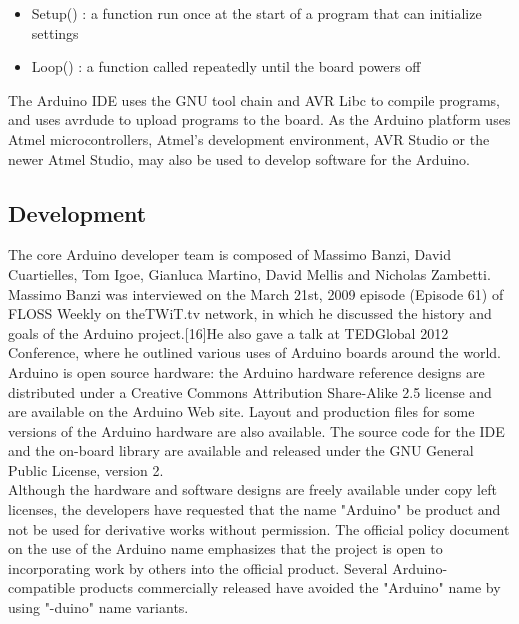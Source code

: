 \documentclass[a4paper, 12pt, notitlepage]{report}
\begin{document}
\begin{itemize}
\item Setup() :  a function run once at the start of a program that can initialize settings
\item Loop() : a function called repeatedly until the board powers off

\end{itemize}


The Arduino IDE uses the GNU tool chain and AVR Libc to compile programs, and uses avrdude to upload programs to the board.
As the Arduino platform uses Atmel microcontrollers, Atmel's development environment, AVR Studio or the newer Atmel Studio,  may also be used to develop software for the Arduino.\\ 

\subsection{Development}

The core Arduino developer team is composed of Massimo Banzi, David Cuartielles, Tom Igoe, Gianluca Martino, David Mellis and Nicholas Zambetti. Massimo Banzi was interviewed on the March 21st, 2009 episode (Episode 61) of FLOSS Weekly on theTWiT.tv network, in which he discussed the history and goals of the Arduino project.[16]He also gave a talk at TEDGlobal 2012 Conference, where he outlined various uses of Arduino boards around the world. \\

Arduino is open source hardware: the Arduino hardware reference designs are distributed under a Creative Commons Attribution Share-Alike 2.5 license and are available on the Arduino Web site. Layout and production files for some versions of the Arduino hardware are also available. The source code for the IDE and the on-board library are available and released under the GNU General Public License, version 2. \\

Although the hardware and software designs are freely available under copy left licenses, the developers have requested that the name "Arduino" be product and not be used for derivative works without permission. The official policy document on the use of the Arduino name emphasizes that the project is open to incorporating work by others into the official product. Several Arduino-compatible products commercially released have avoided the "Arduino" name by using "-duino" name variants.\\ 
\end{document}
